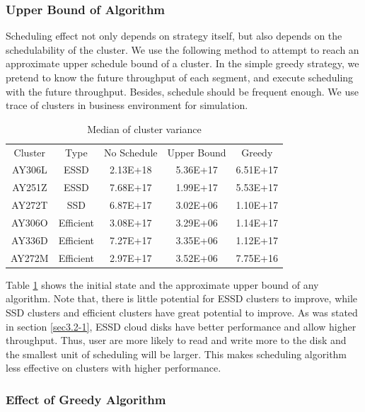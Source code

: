 \documentclass[letterpaper,twocolumn,10pt]{article}
\begin{document}
\subsubsection{Upper Bound of Algorithm}\label{sec3.2-2}

Scheduling effect not only depends on strategy itself, but
also depends on the schedulability of the cluster. We use
the following method to attempt to reach an approximate
upper schedule bound of a cluster. In the simple greedy
strategy, we pretend to know the future throughput of each
segment, and execute scheduling with the future throughput.
Besides, schedule should be frequent enough. We use trace
of clusters in business environment for simulation.

\begin{table}[]
    \centering
    \begin{tabular}{c|c|c|c|c}
         Cluster & Type & No Schedule & Upper Bound & Greedy\\
         AY306L & ESSD & 2.13E+18 & 5.36E+17 & 6.51E+17\\
         AY251Z & ESSD & 7.68E+17 & 1.99E+17& 5.53E+17\\
         AY272T & SSD & 6.87E+17 & 3.02E+06 & 1.10E+17\\
         AY306O & Efficient & 3.08E+17 & 3.29E+06 & 1.14E+17\\
         AY336D & Efficient & 7.27E+17 & 3.35E+06 & 1.12E+17\\
         AY272M & Efficient & 2.97E+17 & 3.52E+06 & 7.75E+16\\
    \end{tabular}
    \caption{Median of cluster variance}
    \label{table3.2-1}
\end{table}

Table \ref{table3.2-1} shows the initial state and the
approximate upper bound of any algorithm. Note that, there
is little potential for ESSD clusters to improve, while SSD
clusters and efficient clusters have great potential to
improve. As was stated in section \ref{sec3.2-1}, ESSD
cloud disks have better performance and allow higher
throughput. Thus, user are more likely to read and write
more to the disk and the smallest unit of scheduling will
be larger. This makes scheduling algorithm less effective
on clusters with higher performance.

\subsubsection{Effect of Greedy Algorithm}\label{sec3.2-3}
\end{document}
